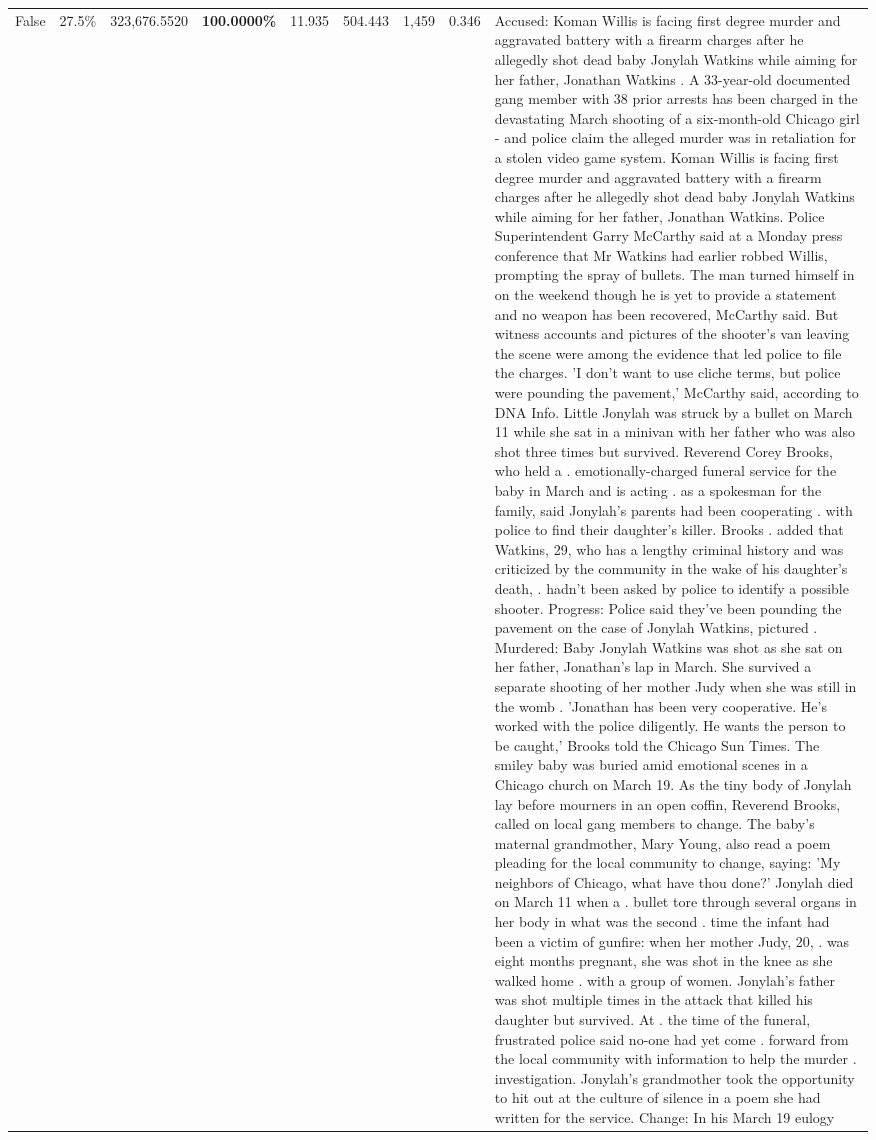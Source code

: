 \begin{table}[H]
\begin{tabular}{lllrlllll}
False & 27.5\% & 323,676.5520 & \bfseries \color{red} 100.0000\% & 11.935 & 504.443 & 1,459 & 0.346 & Accused: Koman Willis is facing first degree murder and aggravated battery with a firearm charges after he allegedly shot dead baby Jonylah Watkins while aiming for her father, Jonathan Watkins . A 33-year-old documented gang member with 38 prior arrests has been charged in the devastating March shooting of a six-month-old Chicago girl - and police claim the alleged murder was in retaliation for a stolen video game system. Koman Willis is facing first degree murder and aggravated battery with a firearm charges after he allegedly shot dead baby Jonylah Watkins while aiming for her father, Jonathan Watkins. Police Superintendent Garry McCarthy said at a Monday press conference that Mr Watkins had earlier robbed Willis, prompting the spray of bullets. The man turned himself in on the weekend though he is yet to provide a statement and no weapon has been recovered, McCarthy said. But witness accounts and pictures of the shooter's van leaving the scene were among the evidence that led police to file the charges. 'I don't want to use cliche terms, but police were pounding the pavement,' McCarthy said, according to DNA Info. Little Jonylah was struck by a bullet on March 11 while she sat in a minivan with her father who was also shot three times but survived. Reverend Corey Brooks, who held a . emotionally-charged funeral service for the baby in March and is acting . as a spokesman for the family, said Jonylah's parents had been cooperating . with police to find their daughter's killer. Brooks . added that Watkins, 29, who has a lengthy criminal history and was criticized by the community in the wake of his daughter's death, . hadn't been asked by police to identify a possible shooter. Progress: Police said they've been pounding the pavement on the case of Jonylah Watkins, pictured . Murdered: Baby Jonylah Watkins was shot as she sat on her father, Jonathan's lap in March. She survived a separate shooting of her mother Judy when she was still in the womb . 'Jonathan has been very cooperative. He's worked with the police diligently. He wants the person to be caught,' Brooks told the Chicago Sun Times. The smiley baby was buried amid emotional scenes in a Chicago church on March 19. As the tiny body of Jonylah lay before mourners in an open coffin, Reverend Brooks, called on local gang members to change. The baby's maternal grandmother, Mary Young, also read a poem pleading for the local community to change, saying: 'My neighbors of Chicago, what have thou done?' Jonylah died on March 11 when a . bullet tore through several organs in her body in what was the second . time the infant had been a victim of gunfire: when her mother Judy, 20, . was eight months pregnant, she was shot in the knee as she walked home . with a group of women. Jonylah's father was shot multiple times in the attack that killed his daughter but survived. At . the time of the funeral, frustrated police said no-one had yet come . forward from the local community with information to help the murder . investigation. Jonylah's grandmother took the opportunity to hit out at the culture of silence in a poem she had written for the service. Change: In his March 19 eulogy 
\end{tabular}
\end{table}
